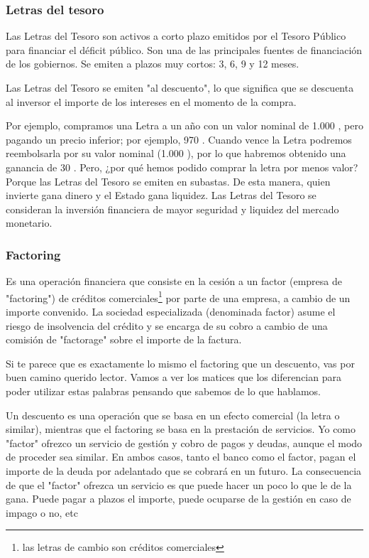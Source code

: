 \documentclass[nochap,palatino,shortheader]{apuntes}
\newcommand{\study}[1]{#1} \newcommand{\substudy}[1]{#1}
\begin{document}
\subsubsection{Letras del tesoro}
Las Letras del Tesoro son activos a corto plazo emitidos por el Tesoro Público para financiar el déficit público. Son una de las principales fuentes de financiación de los gobiernos.
Se emiten a plazos muy cortos: 3, 6, 9 y 12 meses.

Las Letras del Tesoro \study{se emiten "al descuento"}, lo que significa que se descuenta al inversor el importe de los intereses en el momento de la compra.

Por ejemplo, compramos una Letra a un año con un valor nominal de 1.000 \texteuro, pero pagando un precio inferior; por ejemplo, 970 \texteuro.
Cuando vence la Letra podremos reembolsarla por su valor nominal (1.000 \texteuro), por lo que habremos obtenido una ganancia de 30 \texteuro.
Pero, ¿por qué hemos podido comprar la letra por menos valor? Porque las Letras del Tesoro se emiten en subastas. De esta manera, quien invierte gana dinero y el Estado gana liquidez. \substudy{Las Letras del Tesoro se consideran la inversión financiera de mayor seguridad y liquidez del mercado monetario.}


\subsubsection{Factoring}

Es una operación financiera que consiste en la cesión a un factor (empresa de "factoring") de créditos comerciales\footnote{las letras de cambio son créditos comerciales} por parte de una empresa, a cambio de un importe convenido.
La sociedad especializada (denominada factor) asume el riesgo de insolvencia del crédito y se encarga de su cobro a cambio de una comisión de "factorage" sobre el importe de la factura.

Si te parece que es exactamente lo mismo el factoring que un descuento, vas por buen camino querido lector. Vamos a ver los matices que los diferencian para poder utilizar estas palabras pensando que sabemos de lo que hablamos.

Un descuento es una operación que se basa en un efecto comercial (la letra o similar), mientras que el factoring se basa en la prestación de servicios. Yo como "factor" ofrezco un servicio de gestión y cobro de pagos y deudas, aunque el modo de proceder sea similar. En ambos casos, tanto el banco como el factor, pagan el importe de la deuda por adelantado que se cobrará en un futuro. La consecuencia de que el "factor" ofrezca un servicio es que puede hacer un poco lo que le de la gana. Puede pagar a plazos el importe, puede ocuparse de la gestión en caso de impago o no, etc
\end{document}
